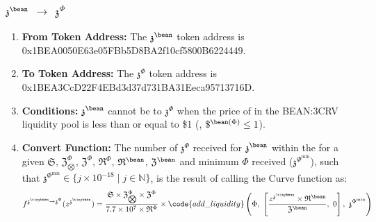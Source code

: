 \documentclass[class=article, crop=false]{standalone}
\begin{document}
\subsubsection{$\mathfrak{z}^{\bean}$ $\rightarrow$ $\mathfrak{z}^{\Phi}$}
    \begin{enumerate}
        \item \textbf{From Token Address:} The $\mathfrak{z}^{\bean}$ token address is 0x1BEA0050E63e05FBb5D8BA2f10cf5800B6224449.
        \item \textbf{To Token Address:} The $\mathfrak{z}^{\Phi}$ token address is 0x1BEA3CcD22F4EBd3d37d731BA31Eeca95713716D.
        \item \textbf{Conditions:}  $\mathfrak{z}^{\bean}$ cannot be  to  $\mathfrak{z}^{\Phi}$ when the price of  in the BEAN:3CRV liquidity pool is less than or equal to \$1 (, $\$^{\bean(\Phi)} \leq 1$). 
        \item \textbf{Convert Function:} The number of $\mathfrak{z}^{\Phi}$ received for   $\mathfrak{z}^{\bean}$ within the  for a given $\mathfrak{S}$, $\mathfrak{Z}_{\bigotimes}^{\Phi}$, $\mathfrak{Z}^{\Phi}$, $\mathfrak{R}^{\Phi}$, $\mathfrak{R}^{\bean}$, $\mathfrak{Z}^{\bean}$ and minimum  $\Phi$ received ($\mathfrak{z}^{\Phi^{\text{min}}}$), such that $\mathfrak{z}^{\Phi^{\text{min}}} \in \{j \times 10^{-18} \mid j \in \mathbb{N} \}$, is the result of calling the Curve  function as:
$$f^{\mathfrak{z}^{\tinybean} \rightarrow \mathfrak{z}^{\Phi}}(z^{\mathfrak{z}^{\tinybean}}) = \frac{\mathfrak{S} \times \mathfrak{Z}_{\bigotimes}^{\Phi} \times \mathfrak{Z}^{\Phi}}{7.7 \times 10^{7} \times \mathfrak{R}^{\Phi}} \times \code{add\_liquidity}\left( \Phi,\ \left[\frac{z^{\mathfrak{z}^{\tinybean}} \times \mathfrak{R}^{\bean}}{\mathfrak{Z}^{\bean}},\ 0\right],\ \mathfrak{z}^{\Phi^{\text{min}}} \right)$$
    \end{enumerate}
\end{document}

